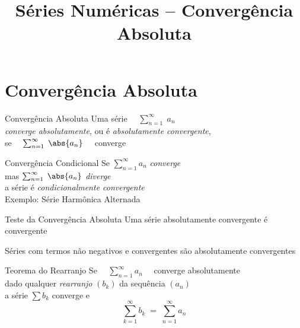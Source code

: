 \documentclass[fleqn,utf8,aspectratio=169,12pt]{beamer}
\title{Séries Numéricas -- Convergência Absoluta}
\begin{document}
\addtitle

\section{Convergência Absoluta}

\begin{frame}{Convergência Absoluta}
  Uma série
  \(\quad \sum_{n=1}^{\infty}\; a_n\) \\[5mm]
  \pause
  \emph{converge absolutamente}, ou é \emph{absolutamente convergente}, \\[5mm]
  \pause
  se
  \(\quad\sum_{n=1}^{\infty} \;\abs{a_n} \quad\) converge
\end{frame}

\begin{frame}{Convergência Condicional}
  Se  \tabto{12mm} \(\sum_{n=1}^{\infty} a_n\)          \tabto{32mm} \emph{converge} \\[9mm]
  \pause
  mas \tabto{12mm} \(\sum_{n=1}^{\infty} \;\abs{a_n} \) \tabto{32mm} \emph{diverge}  \\[9mm]
  \pause
  a série é \emph{condicionalmente convergente} \\[9mm]
  \pause
  Exemplo: Série Harmônica Alternada
\end{frame}

\begin{frame}{Teste da Convergência Absoluta}
  Uma série absolutamente convergente é convergente

  \pause
  \vspace{\baselineskip}
  Séries com termos não negativos e convergentes
  são absolutamente convergentes
\end{frame}

\begin{frame}{Teorema do Rearranjo}
Se \(\quad\sum_{n=1}^{\infty} a_n \quad \) converge absolutamente \\[5mm]

\pause
dado qualquer \emph{rearranjo} $(b_k)$ da sequência $(a_n)$ \\[5mm]

\pause
a série $\sum b_k$ converge e
\[
  \sum_{k=1}^{\infty} b_k \;=\; \sum_{n=1}^{\infty} a_n
\]
\end{frame}
\end{document}
